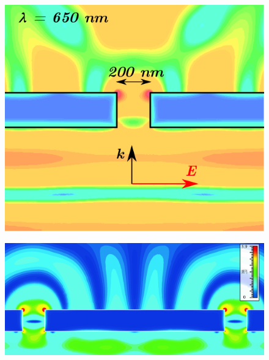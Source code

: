 \documentclass[mathserif,16pt,xcolor=table]{beamer}
\begin{document}
\begin{frame}
\begin{columns}
            \begin{column}{.55\textwidth}
              \vspace*{-1.5cm}
              \begin{figure}
                \includegraphics[scale=.2]{E_squared_final.png}
              \end{figure}
              \vspace*{-1cm}
              \begin{figure} \hspace*{-.25cm} \centering
                \includegraphics[width = 1.05\linewidth]{fig13.jpg}
                \label{fig:cst_simulation}
              \end{figure}
              \end{column}%
            \end{columns}
          \end{frame}
\end{document}
